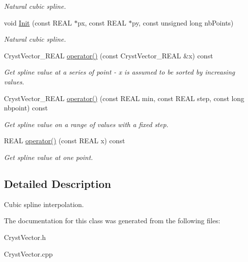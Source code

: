 \begin{DoxyCompactItemize}
\begin{DoxyCompactList}\small\item\em Natural cubic spline. \end{DoxyCompactList}\item 
\mbox{\label{class_cubic_spline_afbdb1826d76b9d0c469d91f99a1c815a}} 
void \mbox{\hyperlink{class_cubic_spline_afbdb1826d76b9d0c469d91f99a1c815a}{Init}} (const R\+E\+AL $\ast$px, const R\+E\+AL $\ast$py, const unsigned long nb\+Points)
\begin{DoxyCompactList}\small\item\em Natural cubic spline. \end{DoxyCompactList}\item 
\mbox{\label{class_cubic_spline_ac2e10a19d524068f3c42675dbffea025}} 
Cryst\+Vector\+\_\+\+R\+E\+AL \mbox{\hyperlink{class_cubic_spline_ac2e10a19d524068f3c42675dbffea025}{operator()}} (const Cryst\+Vector\+\_\+\+R\+E\+AL \&x) const
\begin{DoxyCompactList}\small\item\em Get spline value at a series of point -\/ x is assumed to be sorted by increasing values. \end{DoxyCompactList}\item 
\mbox{\label{class_cubic_spline_ade8e561c7a87f5864fa0ee1b011abc5b}} 
Cryst\+Vector\+\_\+\+R\+E\+AL \mbox{\hyperlink{class_cubic_spline_ade8e561c7a87f5864fa0ee1b011abc5b}{operator()}} (const R\+E\+AL min, const R\+E\+AL step, const long nbpoint) const
\begin{DoxyCompactList}\small\item\em Get spline value on a range of values with a fixed step. \end{DoxyCompactList}\item 
\mbox{\label{class_cubic_spline_ae0e66fc0977697bbe6db96ec6589eb46}} 
R\+E\+AL \mbox{\hyperlink{class_cubic_spline_ae0e66fc0977697bbe6db96ec6589eb46}{operator()}} (const R\+E\+AL x) const
\begin{DoxyCompactList}\small\item\em Get spline value at one point. \end{DoxyCompactList}\end{DoxyCompactItemize}


\subsection{Detailed Description}
Cubic spline interpolation. 

The documentation for this class was generated from the following files\+:\begin{DoxyCompactItemize}
\item 
Cryst\+Vector.\+h\item 
Cryst\+Vector.\+cpp\end{DoxyCompactItemize}
